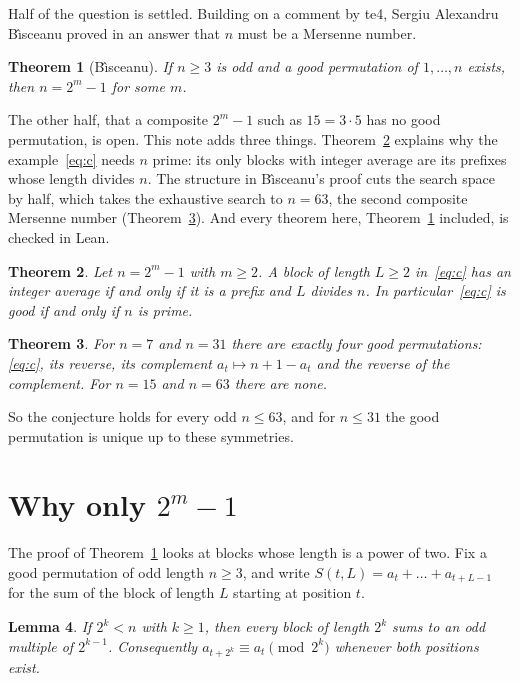 \documentclass[11pt]{amsart}
\newtheorem{theorem}{Theorem}
\newtheorem{lemma}[theorem]{Lemma}
\theoremstyle{remark}
\begin{document}
Half of the question is settled. Building on a comment by te4, Sergiu Alexandru B\^{\i}sceanu proved in an answer \cite{SAB} that $n$ must be a Mersenne number.

\begin{theorem}[B\^{\i}sceanu]\label{thm:mersenne}
If $n\ge3$ is odd and a good permutation of $1,\dots,n$ exists, then $n=2^m-1$ for some $m$.
\end{theorem}

The other half, that a composite $2^m-1$ such as $15=3\cdot5$ has no good permutation, is open. This note adds three things. Theorem~\ref{thm:asker} explains why the example~\eqref{eq:c} needs $n$ prime: its only blocks with integer average are its prefixes whose length divides $n$. The structure in B\^{\i}sceanu's proof cuts the search space by half, which takes the exhaustive search to $n=63$, the second composite Mersenne number (Theorem~\ref{thm:search}). And every theorem here, Theorem~\ref{thm:mersenne} included, is checked in Lean.

\begin{theorem}\label{thm:asker}
Let $n=2^m-1$ with $m\ge2$. A block of length $L\ge2$ in~\eqref{eq:c} has an integer average if and only if it is a prefix and $L$ divides $n$. In particular~\eqref{eq:c} is good if and only if $n$ is prime.
\end{theorem}

\begin{theorem}\label{thm:search}
For $n=7$ and $n=31$ there are exactly four good permutations: \eqref{eq:c}, its reverse, its complement $a_t\mapsto n+1-a_t$ and the reverse of the complement. For $n=15$ and $n=63$ there are none.
\end{theorem}

So the conjecture holds for every odd $n\le63$, and for $n\le31$ the good permutation is unique up to these symmetries.

\section{Why only \texorpdfstring{$2^m-1$}{2\textasciicircum m-1}}

The proof of Theorem~\ref{thm:mersenne} looks at blocks whose length is a power of two. Fix a good permutation of odd length $n\ge3$, and write $S(t,L)=a_t+\dots+a_{t+L-1}$ for the sum of the block of length $L$ starting at position $t$.

\begin{lemma}\label{lem:2adic}
If $2^k<n$ with $k\ge1$, then every block of length $2^k$ sums to an odd multiple of $2^{k-1}$. Consequently $a_{t+2^k}\equiv a_t\pmod{2^k}$ whenever both positions exist.
\end{lemma}
\end{document}
